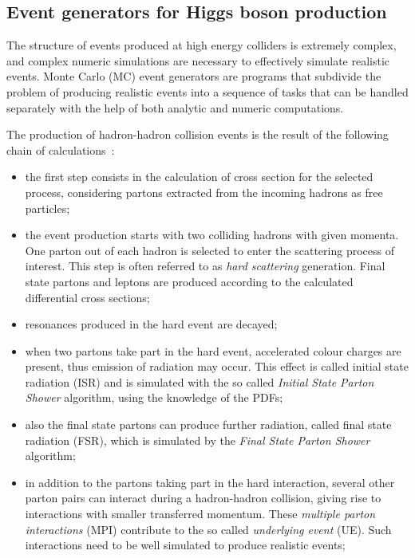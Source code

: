 \subsection{Event generators for Higgs boson production}

The structure of events produced at high energy colliders is extremely complex, and complex numeric simulations are necessary to effectively simulate realistic events. Monte Carlo (MC) event generators are programs that subdivide the problem of producing realistic events into a sequence of tasks that can be handled separately with the help of both analytic and numeric computations.

The production of hadron-hadron collision events is the result of the following chain of calculations~\cite{Sjostrand:2016bif}:

\begin{itemize}
\item the first step consists in the calculation of cross section for the selected process, considering partons extracted from the incoming hadrons as free particles;

\item the event production starts with two colliding hadrons with given momenta. One parton out of each hadron is selected to enter the scattering process of interest. This step is often referred to as \emph{hard scattering} generation. Final state partons and leptons are produced according to the calculated differential cross sections;

\item resonances produced in the hard event are decayed;

\item when two partons take part in the hard event, accelerated colour charges are present, thus emission of radiation may occur. This effect is called initial state radiation (ISR) and is simulated with the so called \emph{Initial State Parton Shower} algorithm, using the knowledge of the PDFs;

\item also the final state partons can produce further radiation, called final state radiation (FSR), which is simulated by the \emph{Final State Parton Shower} algorithm;

\item in addition to the partons taking part in the hard interaction, several other parton pairs can interact during a hadron-hadron collision, giving rise to interactions with smaller transferred momentum. These \emph{multiple parton interactions} (MPI) contribute to the so called \emph{underlying event} (UE). Such interactions need to be well simulated to produce realistic events;


\end{itemize}
